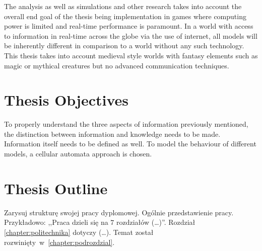The analysis as well as simulations and other research takes into account the overall end goal of the thesis being implementation in games where computing power is limited and real-time performance is paramount.
In a world with access to information in real-time across the globe via the use of internet, all models will be inherently different in comparison to a world without any such technology.
This thesis takes into account medieval style worlds with fantasy elements such as magic or mythical creatures but no advanced communication techniques.

\section{Thesis Objectives}
To properly understand the three aspects of information previously mentioned, the distinction between information and knowledge needs to be made.
Information itself needs to be defined as well.
To model the behaviour of different models, a cellular automata approach is chosen.

\section{Thesis Outline}
Zarysuj strukturę swojej pracy dyplomowej. Ogólnie przedstawienie pracy. Przykładowo: ,,Praca dzieli się na $7$ rozdziałów (\dots)''. Rozdział \ref{chapter:politechnika} dotyczy (\dots). Temat został rozwinięty~w~\ref{chapter:podrozdzial}.